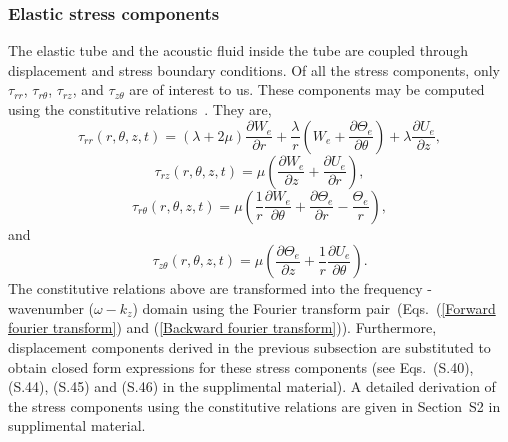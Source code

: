 \documentclass[11pt,cleanfoot]{asme2ej}
\begin{document}
\subsubsection{Elastic stress components}\label{stress components 3d}
The elastic tube and the acoustic fluid inside the tube are coupled through displacement and stress boundary conditions. Of all the stress components, only $\tau_{rr}$, $\tau_{r\theta}$, $\tau_{rz}$, and $\tau_{z\theta}$ are of interest to us. These components may be computed using the constitutive relations~\cite{Martin2014}. They are,
\begin{equation}\label{sigma rr 3d}
    \tau_{rr}(r,\theta,z,t) = \left(\lambda+2\mu\right)\frac{\partial W_{e}}{\partial r} + \frac{\lambda}{r}\left(W_{e} + \frac{\partial \Theta_e}{\partial \theta} \right) + \lambda\frac{\partial U_{e}}{\partial z},
\end{equation}
\begin{equation}\label{tau rz 3d}
    \tau_{rz}(r,\theta,z,t) = \mu\left(\frac{\partial W_{e}}{\partial z} + \frac{\partial U_{e}}{\partial r}\right),
\end{equation}
\begin{equation}\label{tau rtheta 3d}
    \tau_{r\theta}(r,\theta,z,t) = \mu\left(\frac{1}{r}\frac{\partial W_{e}}{\partial \theta} + \frac{\partial \Theta_{e}}{\partial r}-\frac{\Theta_e}{r}\right),
\end{equation}
and
\begin{equation}\label{tau ztheta 3d}
    \tau_{z\theta}(r,\theta,z,t) = \mu\left(\frac{\partial \Theta_{e}}{\partial z} + \frac{1}{r}\frac{\partial U_{e}}{\partial \theta}\right).
\end{equation}
The constitutive relations above are transformed into the frequency - wavenumber ($\omega-k_z$) domain using the Fourier transform pair~(Eqs.~(\ref{Forward fourier transform}) and (\ref{Backward fourier transform})). Furthermore, displacement components derived in the previous subsection are substituted to obtain closed form expressions for these stress components (see Eqs.~(S.40), (S.44), (S.45) and (S.46) in the supplimental material). A detailed derivation of the stress components using the constitutive relations are given in Section~S2 in supplimental material.
\end{document}
